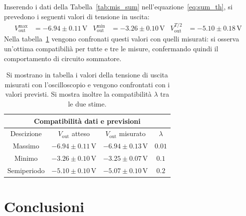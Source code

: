 \documentclass[a4paper,11pt]{article}
\newcommand\V{ \,\si{\volt} }
\begin{document}
Inserendo i dati della Tabella~\ref{tab:mis_sum} nell'equazione~\ref{eq:sum_th}, si prevedono i seguenti
valori di tensione in uscita:
\begin{align}
  \label{eq:11}
  V_{\text{out}}^{\text{max}} & = -6.94 \pm 0.11 \V
  &
    V_{\text{out}}^{\text{min}} & = -3.26 \pm 0.10 \V
  &
    V_{\text{out}}^{T/2}& = -5.10 \pm 0.18 \V
\end{align}
Nella tabella~\ref{tab:comp_sum} vengono confronati questi valori con quelli misurati: si osserva
un'ottima compatibilià per tutte e tre le misure, confermando quindi il comportamento
di circuito sommatore.
\begin{table}
\centering
\setlength{\tabcolsep}{10pt}
\begin{tabular}{ |c|c|c|c|  }
  \hline
  \multicolumn{4}{|c|}{Compatibilità dati e previsioni} \\
  \hline
  Descizione & $V_{\text{out}}$ atteso  & $V_{\text{out}}$ misurato & $\lambda$\\
  \hline
  Massimo & $-6.94 \pm 0.11 \V$ & $-6.94 \pm 0.13 \V$ & $0.01$ \\
  Minimo & $-3.26 \pm 0.10 \V$ & $-3.25 \pm 0.07 \V$ & $0.1$ \\
  Semiperiodo & $ -5.10 \pm 0.10 \V$ & $-5.07 \pm 0.10 \V$ & $0.2$ \\
  \hline
\end{tabular}
\caption{\footnotesize Si mostrano in tabella i valori della tensione di uscita misurati con l'oscilloscopio e vengono confrontati con i valori previsti. Si mostra inoltre la compatibilità $\lambda$ tra le due stime.}\label{tab:comp_sum}
\end{table}

\section{Conclusioni}
\label{sec:conclusioni}
\end{document}
